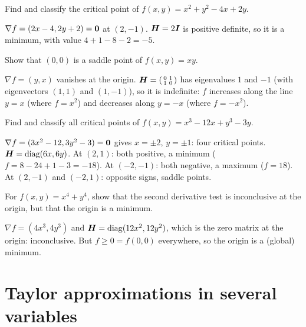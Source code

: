 \begin{exercise}
Find and classify the critical point of $f(x, y) = x^2 + y^2 - 4x + 2y$.
\end{exercise}
\begin{solution}
$\nabla f = (2x - 4, 2y + 2) = \bm{0}$ at $(2, -1)$. $\bm{H} = 2\bm{I}$ is positive
definite, so it is a minimum, with value $4 + 1 - 8 - 2 = -5$.
\end{solution}

\begin{exercise}
Show that $(0, 0)$ is a saddle point of $f(x, y) = xy$.
\end{exercise}
\begin{solution}
$\nabla f = (y, x)$ vanishes at the origin. $\bm{H} = \left(\begin{smallmatrix} 0 &
1\\ 1 & 0\end{smallmatrix}\right)$ has eigenvalues $1$ and $-1$ (with
eigenvectors $(1,1)$ and $(1,-1)$), so it is indefinite: $f$ increases along
the line $y = x$ (where $f = x^2$) and decreases along $y = -x$ (where
$f = -x^2$).
\end{solution}

\begin{exercise}
Find and classify all critical points of $f(x, y) = x^3 - 12x + y^3 - 3y$.
\end{exercise}
\begin{solution}
$\nabla f = (3x^2 - 12, 3y^2 - 3) = \bm{0}$ gives $x = \pm2$, $y = \pm1$: four
critical points. $\bm{H} = \operatorname{diag}(6x, 6y)$. At $(2, 1)$: both positive, a minimum
($f = 8 - 24 + 1 - 3 = -18$). At $(-2, -1)$: both negative, a maximum
($f = 18$). At $(2, -1)$ and $(-2, 1)$: opposite signs, saddle points.
\end{solution}

\begin{exercise}
For $f(x, y) = x^4 + y^4$, show that the second derivative test is
inconclusive at the origin, but that the origin is a minimum.
\end{exercise}
\begin{solution}
$\nabla f = (4x^3, 4y^3)$ and $\bm{H} = \operatorname{diag}(12x^2, 12y^2)$, which is the zero
matrix at the origin: inconclusive. But $f \ge 0 = f(0, 0)$ everywhere, so the
origin is a (global) minimum.
\end{solution}

\section{Taylor approximations in several variables}\label{sec:taylor-multi}


